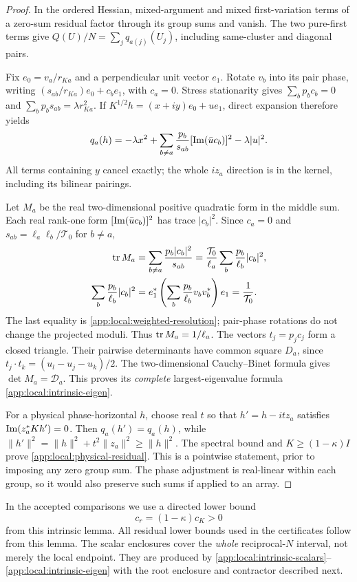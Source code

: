 \begin{proof}
In the ordered Hessian, mixed-argument and mixed first-variation terms
of a zero-sum residual factor through its group sums and vanish.
The two pure-first terms give $Q(U)/N=\sum_jq_{a(j)}(U_j)$,
including same-cluster and diagonal pairs.

Fix $e_0=v_a/r_{Ka}$ and a perpendicular unit vector $e_1$.
Rotate $v_b$ into its pair phase, writing
$(s_{ab}/r_{Ka})e_0+c_be_1$, with $c_a=0$.
Stress stationarity gives
$\sum_bp_bc_b=0$ and $\sum_bp_bs_{ab}=\lambda r_{Ka}^2$.
If $K^{1/2}h=(x+iy)e_0+u e_1$, direct expansion therefore yields
\[
 q_a(h)=-\lambda x^2+
         \sum_{b\ne a}\frac{p_b}{s_{ab}}
                [\operatorname{Im}(\bar u c_b)]^2-\lambda|u|^2 .
\]
All terms containing $y$ cancel exactly; the whole $iz_a$ direction
is in the kernel, including its bilinear pairings.

Let $M_a$ be the real two-dimensional positive quadratic form in the
middle sum. Each real rank-one form $[\operatorname{Im}(\bar u c_b)]^2$
has trace $|c_b|^2$. Since $c_a=0$ and $s_{ab}=\ell_a\ell_b/\mathcal T_0$ for $b\ne a$,
\begin{align*}
 \operatorname{tr} M_a&=\sum_{b\ne a}\frac{p_b|c_b|^2}{s_{ab}}
 =\frac{\mathcal T_0}{\ell_a}\sum_b\frac{p_b}{\ell_b}|c_b|^2,\\
 \sum_b\frac{p_b}{\ell_b}|c_b|^2
 &=e_1^*\left(\sum_b\frac{p_b}{\ell_b}v_bv_b^*\right)e_1
 =\frac1{\mathcal T_0}.
\end{align*}
The last equality is \eqref{app:local:weighted-resolution}; pair-phase
rotations do not change the projected moduli. Thus $\operatorname{tr} M_a=1/\ell_a$.
The vectors $t_j=p_jc_j$ form a closed triangle. Their pairwise
determinants have common square $D_a$, since
$t_j\cdot t_k=(u_l-u_j-u_k)/2$.
The two-dimensional Cauchy--Binet formula gives $\det M_a=\mathcal D_a$.
This proves its \emph{complete} largest-eigenvalue formula
\eqref{app:local:intrinsic-eigen}.

For a physical phase-horizontal $h$, choose real $t$ so that
$h'=h-it z_a$ satisfies $\operatorname{Im}(z_a^*Kh')=0$.
Then $q_a(h')=q_a(h)$, while
$\|h'\|^2=\|h\|^2+t^2\|z_a\|^2\ge\|h\|^2$.
The spectral bound and $K\ge(1-\kappa)I$ prove
\eqref{app:local:physical-residual}.
This is a pointwise statement, prior to imposing any zero group sum.
The phase adjustment is real-linear within each group, so it would also
preserve such sums if applied to an array.
\end{proof}

In the accepted comparisons we use a directed lower bound
\begin{equation}\label{app:local:cr}
 c_r=(1-\kappa)c_K>0
\end{equation}
from this intrinsic lemma. All residual lower bounds used in the
certificates follow from this lemma.
The scalar enclosures cover the \emph{whole} reciprocal-$N$ interval,
not merely the local endpoint. They are produced by
\eqref{app:local:intrinsic-scalars}--\eqref{app:local:intrinsic-eigen}
with the root enclosure and contractor described next.

